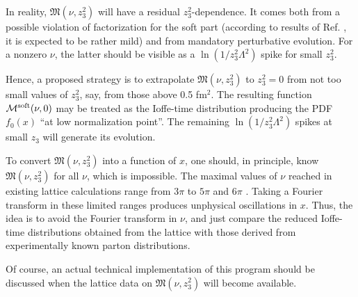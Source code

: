 In reality, ${\mathfrak M} (\nu, z_3^2)$ will have
a residual \mbox{$z_3^2$-dependence.}
It comes both
from a possible
violation of factorization for the soft part
(according to results of Ref. \cite{Musch:2010ka},
it is expected to be rather mild) and
from mandatory perturbative evolution. For a nonzero $\nu$,
the latter should be visible as a
$\ln (1/z_3^2 \Lambda^2)$ spike for small $z_3^2$.

Hence, a proposed strategy is to extrapolate
${\mathfrak M} (\nu, z_3^2)$ to $z_3^2=0$ from not too small
values of $z_3^2$, say, from those above 0.5 fm$^2$.
The resulting function ${\cal M} ^{\rm soft}(\nu,0)$
may be treated as
the Ioffe-time distribution producing the PDF $f_0(x)$
``at low normalization point''. The remaining
$\ln (1/z_3^2 \Lambda^2)$ spikes at small $z_3$ will generate its evolution.

To convert ${\mathfrak M} (\nu, z_3^2)$ into a function of $x$, one should, in principle,
know ${\mathfrak M} (\nu, z_3^2)$ for all $\nu$, which is impossible.
The maximal values of $\nu$ reached in existing lattice calculations
range from $3\pi $ \cite{Lin:2014zya} to $5\pi$ \cite{Alexandrou:2015rja} and $6 \pi $ \cite{Orginos:2017kos}.
Taking a Fourier transform in these limited ranges produces
unphysical oscillations in $x$.
Thus, the idea is to avoid the Fourier transform in $\nu$,
and just compare the reduced Ioffe-time distributions obtained from the
lattice
with those derived from experimentally known parton distributions.

Of course, an actual technical implementation of this program
should be discussed when the lattice data on ${\mathfrak M} (\nu, z_3^2)$
will become available.
